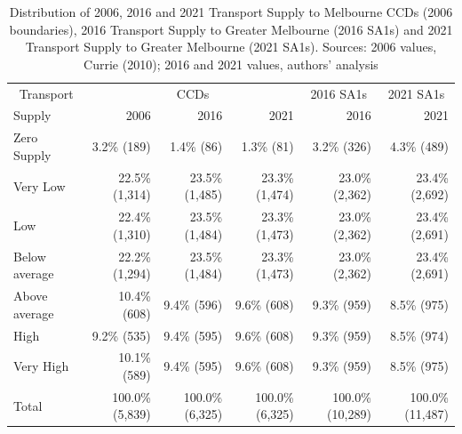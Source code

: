 \documentclass[preprint, 3p,
authoryear]{elsarticle} %
\begin{document}
\begin{longtable}[t]{lrrrrr}
\caption{\label{tab:Greater_Melbourne_CCDs_SA1_table}Distribution of 2006, 2016 and 2021 Transport Supply to Melbourne CCDs (2006 boundaries), 2016 Transport Supply to Greater Melbourne (2016 SA1s) and 2021 Transport Supply to Greater Melbourne (2021 SA1s). Sources: 2006 values, Currie (2010); 2016 and 2021 values, authors' analysis}\\
\toprule
\multicolumn{1}{c}{Transport} & \multicolumn{3}{c}{CCDs} & \multicolumn{1}{c}{2016 SA1s} & \multicolumn{1}{c}{2021 SA1s} \\
\cmidrule(l{3pt}r{3pt}){1-1} \cmidrule(l{3pt}r{3pt}){2-4} \cmidrule(l{3pt}r{3pt}){5-5} \cmidrule(l{3pt}r{3pt}){6-6}
Supply & 2006 & 2016 & 2021 & 2016 & 2021\\
\midrule
Zero Supply & 3.2\%   (189) & 1.4\%    (86) & 1.3\%    (81) & 3.2\%    (326) & 4.3\%    (489)\\
Very Low & 22.5\% (1,314) & 23.5\% (1,485) & 23.3\% (1,474) & 23.0\%  (2,362) & 23.4\%  (2,692)\\
Low & 22.4\% (1,310) & 23.5\% (1,484) & 23.3\% (1,473) & 23.0\%  (2,362) & 23.4\%  (2,691)\\
Below average & 22.2\% (1,294) & 23.5\% (1,484) & 23.3\% (1,473) & 23.0\%  (2,362) & 23.4\%  (2,691)\\
Above average & 10.4\%   (608) & 9.4\%   (596) & 9.6\%   (608) & 9.3\%    (959) & 8.5\%    (975)\\
\addlinespace
High & 9.2\%   (535) & 9.4\%   (595) & 9.6\%   (608) & 9.3\%    (959) & 8.5\%    (974)\\
Very High & 10.1\%   (589) & 9.4\%   (595) & 9.6\%   (608) & 9.3\%    (959) & 8.5\%    (975)\\
Total & 100.0\% (5,839) & 100.0\% (6,325) & 100.0\% (6,325) & 100.0\% (10,289) & 100.0\% (11,487)\\
\bottomrule
\end{longtable}
\end{document}
